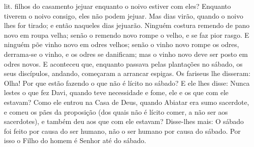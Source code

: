 {{lit. filhos
} do casamento jejuar enquanto o noivo estiver com eles? Enquanto tiverem o noivo consigo, eles não podem jejuar.
  Mas dias virão, quando o noivo lhes for tirado; e então naqueles dias jejuarão.
  Ninguém costura remendo de pano novo em roupa velha; senão o remendo novo rompe o velho, e se faz pior rasgo.
  E ninguém põe vinho novo em odres velhos; senão o vinho novo rompe os odres, derrama-se o vinho, e os odres se danificam; mas o vinho novo deve ser posto em odres novos.
  E aconteceu que, enquanto
{} passava pelas plantações no sábado, os seus discípulos, andando, começaram a arrancar espigas.
  Os fariseus lhe disseram: Olha! Por que estão fazendo o que não é lícito no sábado?
  E ele lhes disse: Nunca lestes o que fez Davi, quando teve necessidade e fome, ele e os que com ele estavam?
  Como ele entrou na Casa de Deus, quando Abiatar era sumo sacerdote, e comeu os pães da proposição (dos quais não é lícito comer, a não ser aos sacerdotes), e também deu aos que com ele estavam?
  Disse-lhes mais: O sábado foi feito por causa do ser humano, não o ser humano por causa do sábado.
  Por isso o Filho do homem é Senhor até do sábado.
\par }

